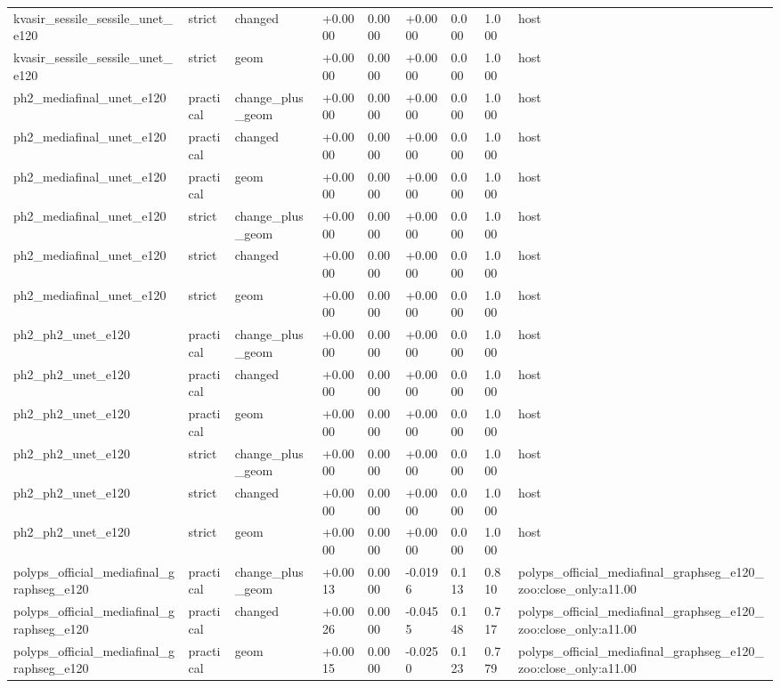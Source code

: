 \begin{table}[t]
\begin{tabular}{lllllllll}
kvasir\_sessile\_sessile\_unet\_e120 & strict & changed & +0.0000 & 0.0000 & +0.0000 & 0.000 & 1.000 & host \\
kvasir\_sessile\_sessile\_unet\_e120 & strict & geom & +0.0000 & 0.0000 & +0.0000 & 0.000 & 1.000 & host \\
ph2\_mediafinal\_unet\_e120 & practical & change\_plus\_geom & +0.0000 & 0.0000 & +0.0000 & 0.000 & 1.000 & host \\
ph2\_mediafinal\_unet\_e120 & practical & changed & +0.0000 & 0.0000 & +0.0000 & 0.000 & 1.000 & host \\
ph2\_mediafinal\_unet\_e120 & practical & geom & +0.0000 & 0.0000 & +0.0000 & 0.000 & 1.000 & host \\
ph2\_mediafinal\_unet\_e120 & strict & change\_plus\_geom & +0.0000 & 0.0000 & +0.0000 & 0.000 & 1.000 & host \\
ph2\_mediafinal\_unet\_e120 & strict & changed & +0.0000 & 0.0000 & +0.0000 & 0.000 & 1.000 & host \\
ph2\_mediafinal\_unet\_e120 & strict & geom & +0.0000 & 0.0000 & +0.0000 & 0.000 & 1.000 & host \\
ph2\_ph2\_unet\_e120 & practical & change\_plus\_geom & +0.0000 & 0.0000 & +0.0000 & 0.000 & 1.000 & host \\
ph2\_ph2\_unet\_e120 & practical & changed & +0.0000 & 0.0000 & +0.0000 & 0.000 & 1.000 & host \\
ph2\_ph2\_unet\_e120 & practical & geom & +0.0000 & 0.0000 & +0.0000 & 0.000 & 1.000 & host \\
ph2\_ph2\_unet\_e120 & strict & change\_plus\_geom & +0.0000 & 0.0000 & +0.0000 & 0.000 & 1.000 & host \\
ph2\_ph2\_unet\_e120 & strict & changed & +0.0000 & 0.0000 & +0.0000 & 0.000 & 1.000 & host \\
ph2\_ph2\_unet\_e120 & strict & geom & +0.0000 & 0.0000 & +0.0000 & 0.000 & 1.000 & host \\
polyps\_official\_mediafinal\_graphseg\_e120 & practical & change\_plus\_geom & +0.0013 & 0.0000 & -0.0196 & 0.113 & 0.810 & polyps\_official\_mediafinal\_graphseg\_e120\_zoo:close\_only:a11.00 \\
polyps\_official\_mediafinal\_graphseg\_e120 & practical & changed & +0.0026 & 0.0000 & -0.0455 & 0.148 & 0.717 & polyps\_official\_mediafinal\_graphseg\_e120\_zoo:close\_only:a11.00 \\
polyps\_official\_mediafinal\_graphseg\_e120 & practical & geom & +0.0015 & 0.0000 & -0.0250 & 0.123 & 0.779 & polyps\_official\_mediafinal\_graphseg\_e120\_zoo:close\_only:a11.00 \\

\end{tabular}
\end{table}
